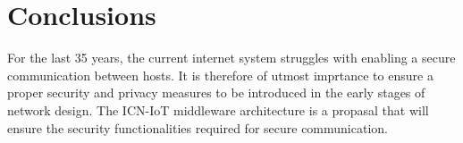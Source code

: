 \section{Conclusions}
For the last 35 years, the current internet system struggles with enabling a secure communication between hosts. It is therefore of utmost imprtance to ensure a proper security and privacy measures to be introduced in the early stages of network design. The ICN-IoT middleware architecture is a propasal that will ensure the security functionalities required for secure communication.



